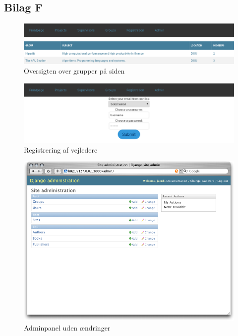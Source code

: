 \documentclass[12pt]{article}
\begin{document}
\subsection{Bilag F}
\label{sec:bilag_frontend}
\begin{figure}[H]
    \centering
    \includegraphics[scale=0.33]{frontend_groups.png}
    \caption{Oversigten over grupper på siden}
    \label{fig:frontend_groups}
\end{figure}
\begin{figure}[H]
    \centering
    \includegraphics[scale=0.33]{frontend_registration.png}
    \caption{Registrering af vejledere}
    \label{fig:frontend_registration}
\end{figure}
\begin{figure}[H]
    \centering
    \includegraphics[scale=0.5]{frontend_admin_vanilla.png}
    \caption{Adminpanel uden ændringer\cite{figure_djangoadmin}}
    \label{fig:frontend_admin_vanilla}
\end{figure}
\end{document}
